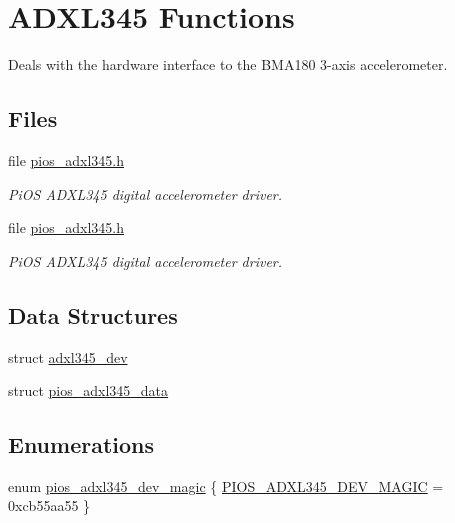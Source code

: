 \hypertarget{group___p_i_o_s___a_d_x_l345}{\section{A\-D\-X\-L345 Functions}
\label{group___p_i_o_s___a_d_x_l345}
}


Deals with the hardware interface to the B\-M\-A180 3-\/axis accelerometer.  


\subsection*{Files}
\begin{DoxyCompactItemize}
\item 
file \hyperlink{pios__adxl345_8h}{pios\-\_\-adxl345.\-h}
\begin{DoxyCompactList}\small\item\em Pi\-O\-S A\-D\-X\-L345 digital accelerometer driver. \end{DoxyCompactList}\item 
file \hyperlink{pios__adxl345_8h}{pios\-\_\-adxl345.\-h}
\begin{DoxyCompactList}\small\item\em Pi\-O\-S A\-D\-X\-L345 digital accelerometer driver. \end{DoxyCompactList}\end{DoxyCompactItemize}
\subsection*{Data Structures}
\begin{DoxyCompactItemize}
\item 
struct \hyperlink{structadxl345__dev}{adxl345\-\_\-dev}
\item 
struct \hyperlink{structpios__adxl345__data}{pios\-\_\-adxl345\-\_\-data}
\end{DoxyCompactItemize}
\subsection*{Enumerations}
\begin{DoxyCompactItemize}
\item 
enum \hyperlink{group___p_i_o_s___a_d_x_l345_ga2f1fd1a4af16c722d816221da8924b5c}{pios\-\_\-adxl345\-\_\-dev\-\_\-magic} \{ \hyperlink{group___p_i_o_s___a_d_x_l345_gga2f1fd1a4af16c722d816221da8924b5cab73bd0af0ffc1314313bd59dbcfefaeb}{P\-I\-O\-S\-\_\-\-A\-D\-X\-L345\-\_\-\-D\-E\-V\-\_\-\-M\-A\-G\-I\-C} = 0xcb55aa55
 \}
\end{DoxyCompactItemize}
